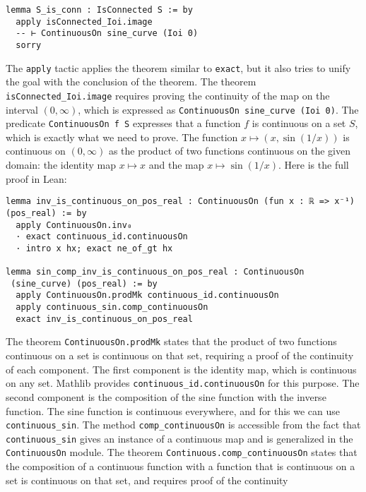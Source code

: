 \begin{lstlisting}[language=lean]
lemma S_is_conn : IsConnected S := by
  apply isConnected_Ioi.image
  -- ⊢ ContinuousOn sine_curve (Ioi 0) 
  sorry
\end{lstlisting}
The \lstinline[language=lean]|apply| tactic applies the theorem similar to \lstinline[language=lean]|exact|, but it also tries
to unify the goal with the conclusion of the theorem.
The theorem \lstinline[language=lean]|isConnected_Ioi.image| requires proving the continuity of the map
on the interval $(0, \infty)$, which is expressed as
\lstinline[language=lean]|ContinuousOn sine_curve (Ioi 0)|.
The predicate \lstinline[language=lean]|ContinuousOn f S|
expresses that a function $f$ is continuous on a set $S$, which is exactly what we need to prove.
The function $x \mapsto (x, \sin(1/x))$ is continuous on $(0, \infty)$ as the
product of two functions continuous on the given domain: the identity map $x \mapsto x$
and the map $x \mapsto \sin(1/x)$.
Here is the full proof in Lean:
\begin{lstlisting}[language=lean]
lemma inv_is_continuous_on_pos_real : ContinuousOn (fun x : ℝ => x⁻¹) (pos_real) := by
  apply ContinuousOn.inv₀
  · exact continuous_id.continuousOn
  · intro x hx; exact ne_of_gt hx

lemma sin_comp_inv_is_continuous_on_pos_real : ContinuousOn
 (sine_curve) (pos_real) := by
  apply ContinuousOn.prodMk continuous_id.continuousOn
  apply continuous_sin.comp_continuousOn
  exact inv_is_continuous_on_pos_real
\end{lstlisting}
The theorem \lstinline[language=lean]|ContinuousOn.prodMk| states that the product of two functions continuous on a set is continuous on that set,
requiring a proof of the continuity of each component.
The first component is the identity map, which is continuous on any set. Mathlib provides
\lstinline[language=lean]|continuous_id.continuousOn| for this purpose.
The second component is the composition of the sine function with the inverse function.
The sine function is continuous everywhere, and for this we can use
\lstinline[language=lean]|continuous_sin|.
The method \lstinline[language=lean]|comp_continuousOn| is accessible from the fact that \lstinline[language=lean]|continuous_sin| gives
an instance of a continuous map and is generalized in the \lstinline[language=lean]|ContinuousOn| module.
The theorem \lstinline[language=lean]|Continuous.comp_continuousOn| states that the composition of a continuous function with a function
that is continuous on a set is continuous on that set, and requires proof of the continuity
